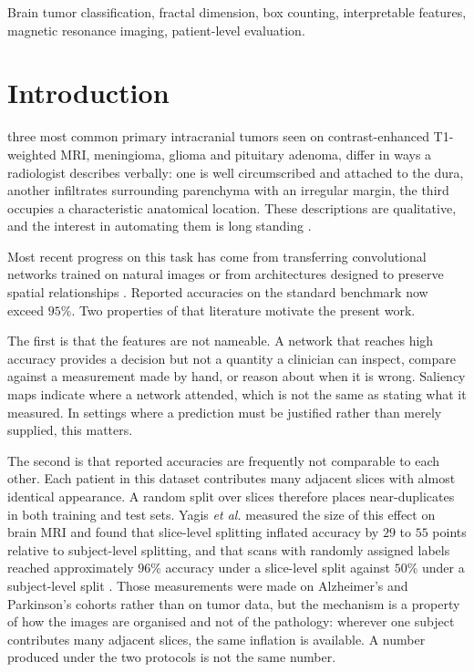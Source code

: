 \documentclass[journal]{IEEEtran}
\begin{document}
\begin{IEEEkeywords}
Brain tumor classification, fractal dimension, box counting, interpretable
features, magnetic resonance imaging, patient-level evaluation.
\end{IEEEkeywords}

\section{Introduction}
 three most common primary intracranial tumors seen on
contrast-enhanced T1-weighted MRI, meningioma, glioma and pituitary adenoma,
differ in ways a radiologist describes verbally: one is well circumscribed and
attached to the dura, another infiltrates surrounding parenchyma with an
irregular margin, the third occupies a characteristic anatomical location. These
descriptions are qualitative, and the interest in automating them is long
standing \cite{cheng2015,gumaei2019,deepak2019}.

Most recent progress on this task has come from transferring convolutional
networks trained on natural images \cite{deepak2019,swati2019} or from
architectures designed to preserve spatial relationships \cite{afshar2019}.
Reported accuracies on the standard benchmark now exceed $95\%$. Two properties
of that literature motivate the present work.

The first is that the features are not nameable. A network that reaches high
accuracy provides a decision but not a quantity a clinician can inspect, compare
against a measurement made by hand, or reason about when it is wrong. Saliency
maps indicate where a network attended, which is not the same as stating what it
measured. In settings where a prediction must be justified rather than merely
supplied, this matters.

The second is that reported accuracies are frequently not comparable to each
other. Each patient in this dataset contributes many adjacent slices with almost
identical appearance. A random split over slices therefore places near-duplicates
in both training and test sets. Yagis \emph{et al.} measured the size of this
effect on brain MRI and found that slice-level splitting inflated accuracy by
$29$ to $55$ points relative to subject-level splitting, and that scans with
randomly assigned labels reached approximately $96\%$ accuracy under a
slice-level split against $50\%$ under a subject-level split \cite{yagis2021}.
Those measurements were made on Alzheimer's and Parkinson's cohorts rather than
on tumor data, but the mechanism is a property of how the images are organised
and not of the pathology: wherever one subject contributes many adjacent slices,
the same inflation is available. A number produced under the two protocols is
not the same number.
\end{document}
